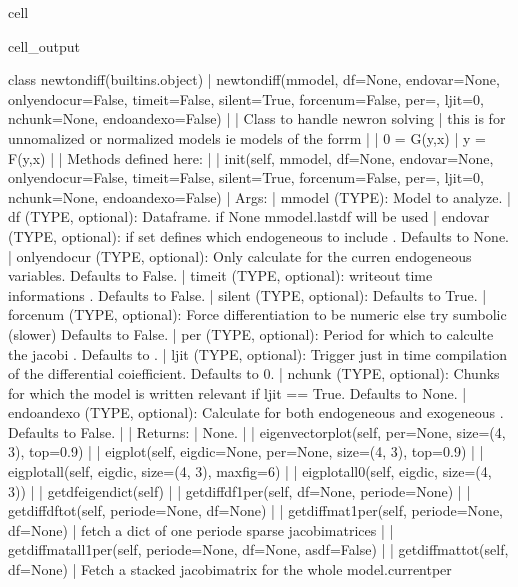 \documentclass[letterpaper,10pt,english]{jupyterBook}
\begin{document}
\begin{sphinxuseclass}{cell}
\begin{sphinxVerbatimOutput}
\begin{sphinxuseclass}{cell_output}
\begin{sphinxVerbatim}[commandchars=\\\{\}]
class newton\PYGZus{}diff(builtins.object)
 |  newton\PYGZus{}diff(mmodel, df=None, endovar=None, onlyendocur=False, timeit=False, silent=True, forcenum=False, per=\PYGZsq{}\PYGZsq{}, ljit=0, nchunk=None, endoandexo=False)
 |  
 |  Class to handle newron solving 
 |  this is for un\PYGZhy{}nomalized or normalized models ie models of the forrm 
 |  
 |  0 = G(y,x)
 |  y = F(y,x)
 |  
 |  Methods defined here:
 |  
 |  \PYGZus{}\PYGZus{}init\PYGZus{}\PYGZus{}(self, mmodel, df=None, endovar=None, onlyendocur=False, timeit=False, silent=True, forcenum=False, per=\PYGZsq{}\PYGZsq{}, ljit=0, nchunk=None, endoandexo=False)
 |      Args:
 |          mmodel (TYPE): Model to analyze.
 |          df (TYPE, optional): Dataframe. if None mmodel.lastdf will be used 
 |          endovar (TYPE, optional): if set defines which endogeneous to include . Defaults to None.
 |          onlyendocur (TYPE, optional): Only calculate for the curren endogeneous variables. Defaults to False.
 |          timeit (TYPE, optional): writeout time informations . Defaults to False.
 |          silent (TYPE, optional):  Defaults to True.
 |          forcenum (TYPE, optional): Force differentiation to be numeric else try sumbolic (slower)  Defaults to False.
 |          per (TYPE, optional): Period for which to calculte the jacobi . Defaults to \PYGZsq{}\PYGZsq{}.
 |          ljit (TYPE, optional): Trigger just in time compilation of the differential coiefficient. Defaults to 0.
 |          nchunk (TYPE, optional): Chunks for which the model is written  \PYGZhy{} relevant if ljit == True. Defaults to None.
 |          endoandexo (TYPE, optional): Calculate for both endogeneous and exogeneous . Defaults to False.
 |      
 |      Returns:
 |          None.
 |  
 |  eigenvector\PYGZus{}plot(self, per=None, size=(4, 3), top=0.9)
 |  
 |  eigplot(self, eig\PYGZus{}dic=None, per=None, size=(4, 3), top=0.9)
 |  
 |  eigplot\PYGZus{}all(self, eig\PYGZus{}dic, size=(4, 3), maxfig=6)
 |  
 |  eigplot\PYGZus{}all0(self, eig\PYGZus{}dic, size=(4, 3))
 |  
 |  get\PYGZus{}df\PYGZus{}eigen\PYGZus{}dict(self)
 |  
 |  get\PYGZus{}diff\PYGZus{}df\PYGZus{}1per(self, df=None, periode=None)
 |  
 |  get\PYGZus{}diff\PYGZus{}df\PYGZus{}tot(self, periode=None, df=None)
 |  
 |  get\PYGZus{}diff\PYGZus{}mat\PYGZus{}1per(self, periode=None, df=None)
 |      fetch a dict of one periode sparse jacobimatrices
 |  
 |  get\PYGZus{}diff\PYGZus{}mat\PYGZus{}all\PYGZus{}1per(self, periode=None, df=None, asdf=False)
 |  
 |  get\PYGZus{}diff\PYGZus{}mat\PYGZus{}tot(self, df=None)
 |      Fetch a stacked jacobimatrix for the whole model.current\PYGZus{}per

\end{sphinxVerbatim}
\end{sphinxuseclass}
\end{sphinxVerbatimOutput}
\end{sphinxuseclass}
\end{document}
